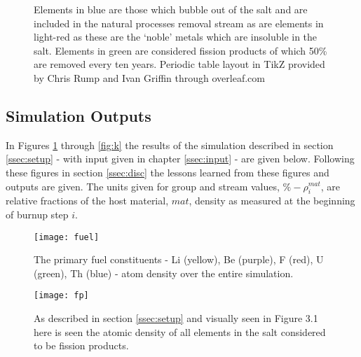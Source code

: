 \begin{figure}
\begin{centering}
\end{centering}
\caption{Elements in blue are those which bubble out of the salt and are
included in the natural processes removal stream as are elements in light-red
as these are the `noble' metals which are insoluble in the salt. Elements in
green are considered fission products of which 50\% are removed every ten
years. Periodic table layout in TikZ provided by Chris Rump and Ivan Griffin
through overleaf.com}
\end{figure}

\subsection{Simulation Outputs}\label{ssec:outputs}

In Figures \ref{fig:fuel} through \ref{fig:k} the results of the simulation
described in section \ref{ssec:setup} - with input given in chapter 
\ref{ssec:input} - are given below. Following these figures in section
\ref{ssec:disc} the lessons learned from these figures and outputs are
given. The units given for group and stream values, $\%-\rho^{mat}_{i}$, are
relative fractions of the host material, $mat$, density as measured at the 
beginning of burnup step $i$.

\begin{figure}[H]
    \centering
    \texttt{[image: fuel]}
    \caption{The primary fuel constituents - Li (yellow), Be (purple), F (red),
    U (green), Th (blue) - atom density over the entire simulation.}
    \label{fig:fuel}
\end{figure}

\begin{figure}[H]
    \centering
    \texttt{[image: fp]}
    \caption{As described in section \ref{ssec:setup} and visually seen in
    Figure 3.1 here is seen the atomic density of all elements
    in the salt considered to be fission products.}
    \label{fig:fp}
\end{figure}

